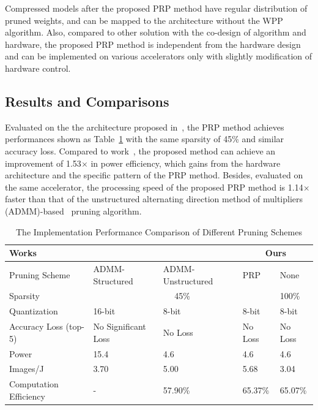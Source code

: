 \documentclass[journal,article,submit,pdftex,moreauthors]{Definitions/mdpi}
\begin{document}
Compressed models after the proposed PRP method have regular distribution of pruned weights, and can be mapped to the architecture without the WPP algorithm. Also, compared to other solution with the co-design of algorithm and hardware, the proposed PRP method is independent from the hardware design and can be implemented on various accelerators only with slightly modification of hardware control.

\subsection{Results and Comparisons}
Evaluated on the the architecture proposed in~\cite{SB}, the PRP method achieves performances shown as Table~\ref{tab:perf} with the same sparsity of 45\% and similar accuracy loss. Compared to work~\cite{shenhaibin}, the proposed method can achieve an improvement of 1.53$\times$ in power efficiency, which gains from the hardware architecture and the specific pattern of the PRP method. Besides, evaluated on the same accelerator, the processing speed of the proposed PRP method is 1.14$\times$ faster than that of the unstructured alternating direction method of multipliers (ADMM)-based~\cite{ADMM} pruning algorithm.
 
\begin{table}[t]
  \centering
  \setlength{\tabcolsep}{8pt}
\renewcommand{\arraystretch}{1.3}
  \begin{threeparttable}
  \caption{The Implementation Performance Comparison of Different Pruning Schemes}
  \label{tab:perf}
    \begin{tabular}{m{2.2cm}<{\centering}||m{2.2cm}<{\centering}|m{2.2cm}<{\centering}|m{2.2cm}<{\centering}|m{2.2cm}<{\centering}}
      \hline\hline
      Works & \cite{shenhaibin} & \cite{SB} & \multicolumn{2}{c}{Ours}\\
      \hline
      Pruning Scheme & ADMM-Structured & ADMM-Unstructured & PRP & None\\
      \hline
      Sparsity & \multicolumn{3}{c}{45\%} & 100\% \\
      \hline
      Quantization & 16-bit & 8-bit & 8-bit & 8-bit \\
      \hline
      Accuracy Loss (top-5) & No Significant Loss & No Loss & No Loss & No Loss \\
      \hline
      Power & 15.4 & 4.6 & 4.6 & 4.6 \\
      \hline
      Images/J & 3.70 & 5.00 & 5.68 & 3.04\\
      \hline
      Computation Efficiency & - & 57.90\% & 65.37\% & 65.07\%\\
      \hline\hline
    \end{tabular}
  \end{threeparttable}
\end{table}
\end{document}
